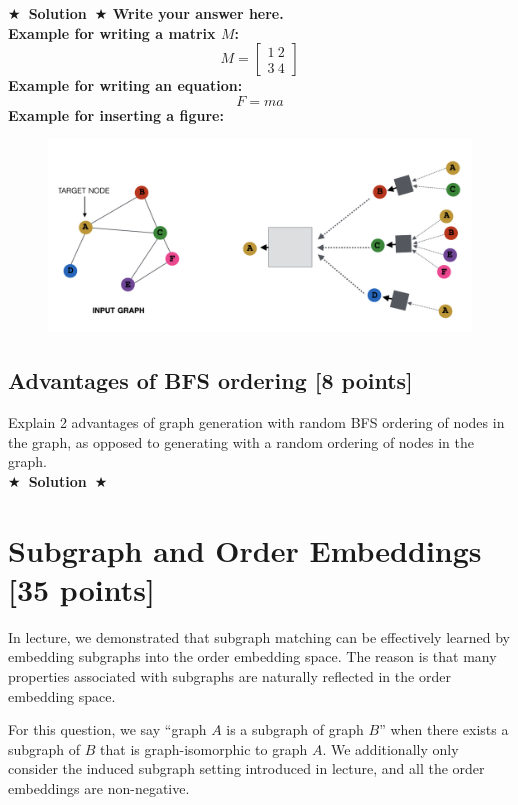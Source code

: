 \documentclass{article}
\newcommand{\Solution}[1]{{\medskip \color{black} \bf $\bigstar$~\sf \textbf{Solution}~$\bigstar$ \sf #1 } \bigskip}
\begin{document}
\Solution{Write your answer here. \\ Example for writing a matrix $M$: \\
 \[M = 
    \begin{bmatrix}
    1 \ 2   \\
    3 \ 4
    \end{bmatrix}
\]
Example for writing an equation:
\begin{equation}
    F=ma
\end{equation}
Example for inserting a figure: 
\begin{figure}[!htb]
\centering
  \includegraphics[width=0.8\columnwidth]{Sample_Image.png}
  \label{fig:Q1.1}
\end{figure}
}

\subsection{Advantages of BFS ordering [8 points]}
Explain 2 advantages of graph generation with random BFS ordering of nodes in
the graph, as opposed to generating with a random ordering of nodes in the graph.\\

\Solution{}




\section{Subgraph and Order Embeddings [35 points]}

In lecture, we demonstrated that subgraph matching can be effectively learned by embedding subgraphs into the order embedding space. The reason is that many properties associated with subgraphs are naturally reflected in the order embedding space.

For this question, we say “graph $A$ is a subgraph of graph $B$” when there exists a subgraph of $B$ that is graph-isomorphic to graph $A$. We additionally only consider the induced subgraph setting introduced in lecture, and all the order embeddings are non-negative.
\end{document}

